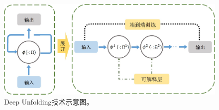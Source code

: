 \begin{figure}[t] 
	\centering
	\includegraphics[width=0.99\linewidth]{figures/unroll.jpg}
	\caption{ \rm Deep Unfolding技术示意图。}
	\label{fig:unrolling}	
\end{figure}
